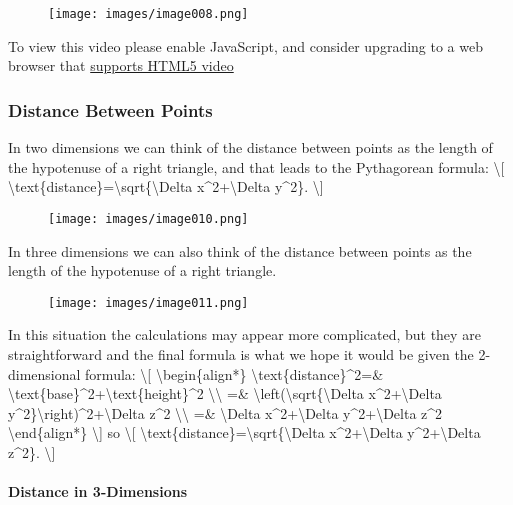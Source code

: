 \begin{figure}
\centering
\texttt{[image: images/image008.png]}
\caption{}
\end{figure}

To view this video please enable JavaScript, and consider upgrading to a
web browser that \href{http://videojs.com/html5-video-support/}{supports
HTML5 video}

\hypertarget{distance-between-points}{%
\subsubsection{Distance Between Points}\label{distance-between-points}}

In two dimensions we can think of the distance between points as the
length of the hypotenuse of a right triangle, and that leads to the
Pythagorean formula: \textbackslash{}{[}
\textbackslash{}text\{distance\}=\textbackslash{}sqrt\{\textbackslash{}Delta
x\^{}2+\textbackslash{}Delta y\^{}2\}. \textbackslash{}{]}

\begin{figure}
\centering
\texttt{[image: images/image010.png]}
\caption{}
\end{figure}

In three dimensions we can also think of the distance between points as
the length of the hypotenuse of a right triangle.

\begin{figure}
\centering
\texttt{[image: images/image011.png]}
\caption{}
\end{figure}

In this situation the calculations may appear more complicated, but they
are straightforward and the final formula is what we hope it would be
given the 2-dimensional formula: \textbackslash{}{[}
\textbackslash{}begin\{align*\} \textbackslash{}text\{distance\}\^{}2=\&
\textbackslash{}text\{base\}\^{}2+\textbackslash{}text\{height\}\^{}2
\textbackslash{}\textbackslash{} =\&
\textbackslash{}left(\textbackslash{}sqrt\{\textbackslash{}Delta
x\^{}2+\textbackslash{}Delta
y\^{}2\}\textbackslash{}right)\^{}2+\textbackslash{}Delta z\^{}2
\textbackslash{}\textbackslash{} =\& \textbackslash{}Delta
x\^{}2+\textbackslash{}Delta y\^{}2+\textbackslash{}Delta z\^{}2
\textbackslash{}end\{align*\} \textbackslash{}{]} so \textbackslash{}{[}
\textbackslash{}text\{distance\}=\textbackslash{}sqrt\{\textbackslash{}Delta
x\^{}2+\textbackslash{}Delta y\^{}2+\textbackslash{}Delta z\^{}2\}.
\textbackslash{}{]}

\hypertarget{distance-in-3-dimensions}{%
\paragraph{Distance in 3-Dimensions}\label{distance-in-3-dimensions}}

